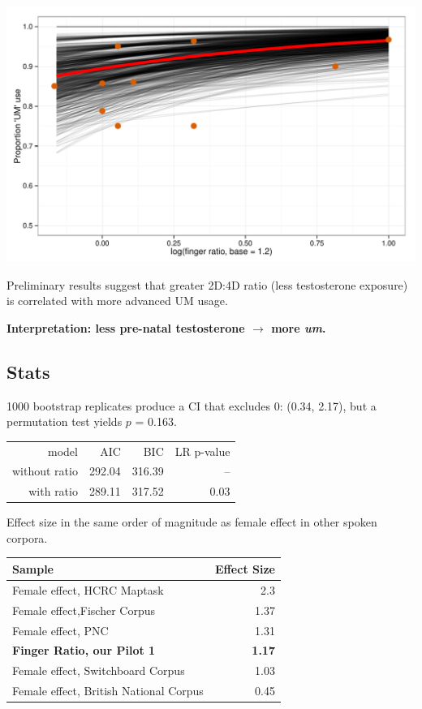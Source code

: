\documentclass[a0,portrait]{a0poster}
\begin{document}
\begin{multicols}{2}
\begin{minipage}[c]{0.70\linewidth}
\includegraphics[width=1\linewidth]{finger_effect.pdf}
\end{minipage}
%
\begin{minipage}[c]{0.25\linewidth}
\large
Preliminary results suggest that greater 2D:4D ratio (less testosterone exposure) is correlated with more advanced UM usage.
\end{minipage}

\begin{center}
\noindent\textbf{Interpretation: less pre-natal testosterone $\rightarrow$ more \textsl{um}.}
\end{center}

\subsection*{Stats}
1000 bootstrap replicates produce a CI that excludes 0: (0.34, 2.17), but a permutation test yields $p$ = 0.163.

\begin{center}
\begin{tabular}{rrrr}
\toprule
	model & AIC & BIC & LR p-value\\
	\cmidrule{2-4}
without ratio & 292.04 & 316.39 & -- \\
with ratio &  289.11 & 317.52 & 0.03\\
\bottomrule
\end{tabular}
\end{center}

\noindent Effect size in the same order of magnitude as female effect in other spoken corpora.
\begin{center}
\begin{tabular}{l r}
\toprule
\textbf{Sample} & \textbf{Effect Size}\\
\midrule
Female effect, HCRC Maptask & 2.3\\
Female effect,Fischer Corpus & 1.37\\
Female effect, PNC & 1.31\\
\textbf{Finger Ratio, our Pilot 1} & \textbf{1.17}\\
Female effect, Switchboard Corpus & 1.03\\
Female effect, British National Corpus & 0.45\\
\bottomrule
\end{tabular}
\end{center}



\end{multicols}
\end{document}
